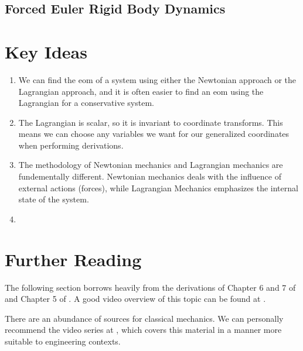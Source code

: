 \documentclass[12pt]{report}
\begin{document}
\subsection{Forced Euler Rigid Body Dynamics}
\section{Key Ideas}
\begin{enumerate}
    \item We can find the \gls{eom} of a system using either the Newtonian approach or the \gls{Lagrangian} approach, and it is often easier to find an \gls{eom} using the \gls{Lagrangian} for a conservative system.
    \item The \gls{Lagrangian} is scalar, so it is invariant to coordinate transforms. This means we can choose any variables we want for our generalized coordinates when performing derivations.
    \item The methodology of Newtonian mechanics and \gls{Lagrangian} mechanics are fundementally different. Newtonian mechanics deals with the influence of external actions (forces), while \gls{Lagrangian} Mechanics emphasizes the internal state of the system.
    \item %
\end{enumerate}
\section{Further Reading}
The following section borrows heavily from the derivations of Chapter 6 and 7 of  \cite{thornton_classical_nodate} and Chapter 5 of  \cite{noauthor_variational_2017}. A good video overview of this topic can be found at \cite{veritasium_closest_2024}.

There are an abundance of sources for classical mechanics. We can personally recommend the video series at \cite{ross_lagranges_nodate}, which covers this material in a manner more suitable to engineering contexts.
\end{document}

